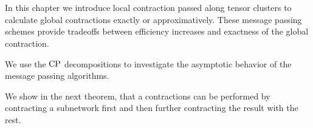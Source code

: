\chapter{\chatextmessagePassing}\label{cha:messagePassing}




In this chapter we introduce local contraction passed along tensor clusters to calculate global contractions exactly or approximatively.
These message passing schemes provide tradeoffs between efficiency increases and exactness of the global contraction.

We use the $\mathrm{CP}$ decompositions to investigate the asymptotic behavior of the message passing algorithms.



We show in the next theorem, that a contractions can be performed by contracting a subnetwork first and then further contracting the result with the rest.

